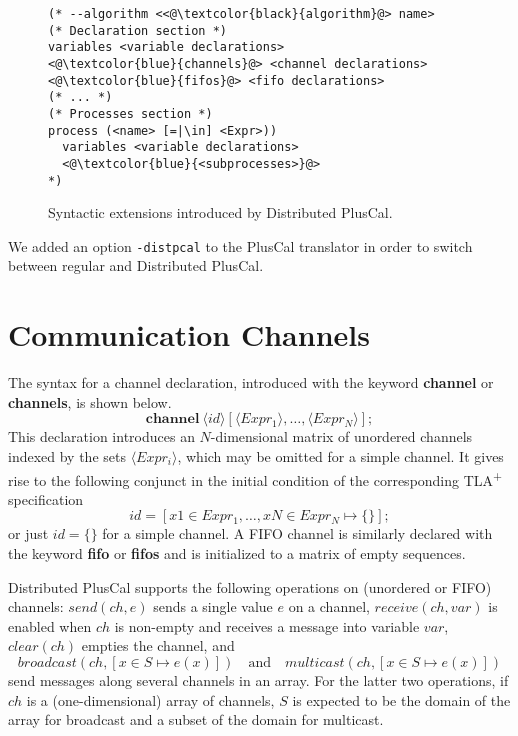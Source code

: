 \documentclass{article}
\newcommand{\tlaplus}{TLA\textsuperscript{+}\xspace}
\newcommand{\keyword}[1]{\textbf{#1}}
\newcommand{\entity}[1]{\ensuremath{\langle}#1\ensuremath{\rangle}}
\begin{document}
\begin{figure}
\begin{lstlisting}[language=pluscal, frame = tlrb, numbers = none]
(* --algorithm <<@\textcolor{black}{algorithm}@> name>
(* Declaration section *)
variables <variable declarations>
<@\textcolor{blue}{channels}@> <channel declarations>
<@\textcolor{blue}{fifos}@> <fifo declarations>
(* ... *)
(* Processes section *)
process (<name> [=|\in] <Expr>))
  variables <variable declarations>
  <@\textcolor{blue}{<subprocesses>}@>
*)
\end{lstlisting}

\caption{Syntactic extensions introduced by Distributed PlusCal.}
\label{dpluscal-struct}
\end{figure}

We added an option \verb|-distpcal| to the PlusCal translator in order to switch between regular and Distributed PlusCal.


\section{Communication Channels}

The syntax for a channel declaration, introduced with the keyword \keyword{channel} or \keyword{channels}, is shown below.
\[
 \keyword{channel}\ \entity{id}[\entity{Expr_1},\dots,\entity{Expr_N}];
\]
This declaration introduces an $N$-dimensional matrix of unordered channels indexed by the sets $\entity{Expr_i}$, which may be omitted for a simple channel. It gives rise to the following conjunct in the initial condition of the corresponding \tlaplus specification
\[
 id = [x1 \in Expr_1,\dots,xN \in Expr_N \mapsto \{ \}];
\]
or just $id = \{\}$ for a simple channel.
%
A FIFO channel is similarly declared with the keyword \keyword{fifo} or \keyword{fifos} and is initialized to a matrix of empty sequences.

Distributed PlusCal supports the following operations on (unordered or FIFO) channels: $send(ch, e)$ sends a single value $e$ on a channel, $receive(ch, var)$ is enabled when $ch$ is non-empty and receives a message into variable $var$, $clear(ch)$ empties the channel, and
\[ broadcast(ch, [x \in S \mapsto e(x)])
   \quad\textrm{and}\quad
   multicast(ch, [x \in S \mapsto e(x)])
\]
send messages along several channels in an array. For the latter two operations, if $ch$ is a (one-dimensional) array of channels, $S$ is expected to be the domain of the array for broadcast and a subset of the domain for multicast.
\end{document}
